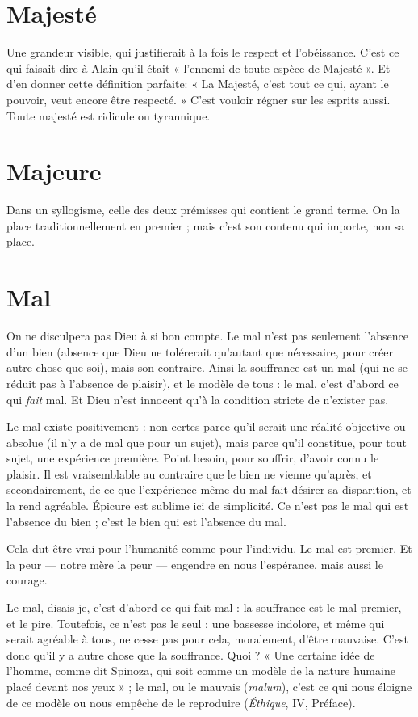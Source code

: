 \section{Majesté}
Une grandeur visible, qui justifierait à la fois le respect et l’obéissance.
C’est ce qui faisait dire à Alain qu'il était « l’ennemi de
toute espèce de Majesté ». Et d’en donner cette définition parfaite: « La
Majesté, c'est tout ce qui, ayant le pouvoir, veut encore être respecté. » C’est
vouloir régner sur les esprits aussi. Toute majesté est ridicule ou tyrannique.

\section{Majeure}
Dans un syllogisme, celle des deux prémisses qui contient le
grand terme. On la place traditionnellement en premier ; mais
c'est son contenu qui importe, non sa place.

\section{Mal}
On ne disculpera pas Dieu à si bon compte. Le mal n’est pas seulement
l’absence d’un bien (absence que Dieu ne tolérerait qu’autant
que nécessaire, pour créer autre chose que soi), mais son contraire. Ainsi la
souffrance est un mal (qui ne se réduit pas à l’absence de plaisir), et le modèle
de tous : le mal, c’est d’abord ce qui {\it fait} mal. Et Dieu n’est innocent qu’à la
condition stricte de n’exister pas.

Le mal existe positivement : non certes parce qu’il serait une réalité objective
ou absolue (il n’y a de mal que pour un sujet), mais parce qu’il constitue,
pour tout sujet, une expérience première. Point besoin, pour souffrir, d’avoir
connu le plaisir. Il est vraisemblable au contraire que le bien ne vienne
qu'après, et secondairement, de ce que l’expérience même du mal fait désirer
sa disparition, et la rend agréable. Épicure est sublime ici de simplicité. Ce
n'est pas le mal qui est l'absence du bien ; c’est le bien qui est l’absence du
mal.

Cela dut être vrai pour l'humanité comme pour l'individu. Le mal est premier.
Et la peur — notre mère la peur — engendre en nous l’espérance, mais aussi
le courage.

Le mal, disais-je, c'est d’abord ce qui fait mal : la souffrance est le mal premier,
et le pire. Toutefois, ce n’est pas le seul : une bassesse indolore, et même qui
serait agréable à tous, ne cesse pas pour cela, moralement, d’être mauvaise. C’est
donc qu’il y a autre chose que la souffrance. Quoi ? « Une certaine idée de
l’homme, comme dit Spinoza, qui soit comme un modèle de la nature humaine
placé devant nos yeux » ; le mal, ou le mauvais ({\it malum}), c’est ce qui nous éloigne
de ce modèle ou nous empêche de le reproduire ({\it Éthique}, IV, Préface).

